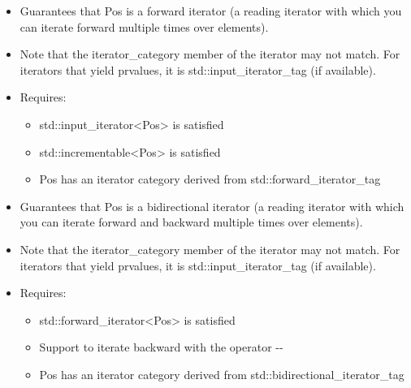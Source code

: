 \begin{itemize}
\item
Guarantees that Pos is a forward iterator (a reading iterator with which you can iterate forward multiple times over elements).

\item
Note that the iterator\_category member of the iterator may not match. For iterators that yield prvalues, it is std::input\_iterator\_tag (if available).

\item
Requires:
\begin{itemize}
\item
std::input\_iterator<Pos> is satisfied

\item
std::incrementable<Pos> is satisfied

\item
Pos has an iterator category derived from std::forward\_iterator\_tag
\end{itemize}
\end{itemize}


\begin{itemize}
\item
Guarantees that Pos is a bidirectional iterator (a reading iterator with which you can iterate forward and backward multiple times over elements).

\item
Note that the iterator\_category member of the iterator may not match. For iterators that yield prvalues, it is std::input\_iterator\_tag (if available).

\item
Requires:
\begin{itemize}
\item
std::forward\_iterator<Pos> is satisfied

\item
Support to iterate backward with the operator -{}-

\item
Pos has an iterator category derived from std::bidirectional\_iterator\_tag
\end{itemize}
\end{itemize}


